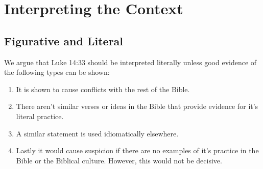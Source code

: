 \documentclass[11pt]{article}
\begin{document}
\section{Interpreting the Context}

\subsection{Figurative and Literal} \label{the figurative and literal}
We argue that Luke 14:33 should be interpreted literally unless good evidence of the following types can be shown: 
\begin{enumerate}
\item It is shown to cause conflicts with the rest of the Bible. 
\item There aren't similar verses or ideas in the Bible that provide evidence for it's literal practice. 
\item A similar statement is used idiomatically elsewhere. 
\item Lastly it would cause suspicion if there are no examples of it's practice in the Bible or the Biblical culture. However, this would not be decisive.
 \end{enumerate}
 
\end{document}
